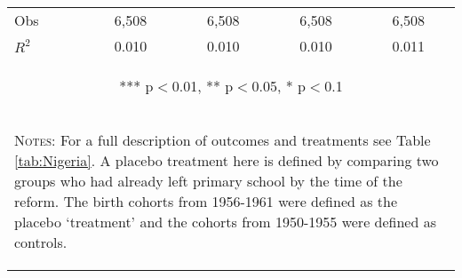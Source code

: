 \begin{subtables}
\begin{table}[htpb!]
\begin{center}
\begin{tabular}{p{5cm}cccc}
Obs	&	6,508	&	6,508	&	6,508	&	6,508	\\  
$R^2$	&	0.010	&	0.010	&	0.010	&	0.011	\\ \midrule
\multicolumn{5}{c}{\begin{footnotesize} *** p$<$0.01, ** p$<$0.05, * p$<$0.1\end{footnotesize}} \\									
\multicolumn{5}{p{12cm}}{\begin{footnotesize}\textsc{Notes:} For a full description of outcomes and treatments see Table \ref{tab:Nigeria}. A placebo treatment here is defined by comparing two groups who had already left primary school by the time of the reform.  The birth cohorts from 1956-1961 were defined as the placebo `treatment' and the cohorts from 1950-1955 were defined as controls. \end{footnotesize}} \\									
\bottomrule									
\end{tabular}									
\end{center}									
\end{table}									


\end{subtables}
